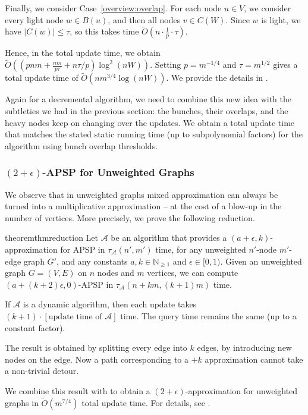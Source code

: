 \documentclass[11pt]{article}
\theoremstyle{definition}
\theoremstyle{remark}
\begin{document}
\begin{titlepage}
Finally, we consider Case~\ref{overview:overlap}. For each node $u\in V$, we consider every light node $w\in B(u)$, and then all nodes $v\in C(W)$. Since $w$ is light, we have $|C(w)|\leq \tau$, so this takes time $\tilde O(n\cdot \tfrac{1}{p}\cdot \tau)$.  

Hence, in the total update time, we obtain $\tilde O((pnm+\tfrac{nm}{p\tau}+n\tau/p)\log^2(nW))$. Setting $p=m^{-1/4}$ and $\tau = m^{1/2}$ gives a total update time of $\tilde O(nm^{3/4}\log(nW))$. We provide the details in .

Again for a decremental algorithm, we need to combine this new idea with the subtleties we had in the previous section: the bunches, their overlaps, and the heavy nodes keep on changing over the updates. We obtain a total update time that matches the stated static running time (up to subpolynomial factors) for the algorithm using bunch overlap thresholds. 

 





\subsubsection{\texorpdfstring{$(2+\epsilon)$}{(2+epsilon)}-APSP for Unweighted Graphs} 
We observe that in unweighted graphs mixed approximation can always be turned into a multiplicative approximation -- at the cost of a blow-up in the number of vertices. More precisely, we prove the following reduction. 
\begin{restatable}{theorem}{thmreduction}\label{thm:reduction}
   Let $\mathcal A$ be an algorithm that provides a $(a+\epsilon,k)$-approximation for APSP in $\tau_{\mathcal A}(n',m')$ time, for any unweighted $n'$-node $m'$-edge graph $G'$, and any constants  $a,k\in \mathbb N_{\geq 1}$ and $\epsilon\in[0,1)$. Given an unweighted graph $G=(V,E)$ on $n$ nodes and $m$ vertices, we can compute $(a+(k+2)\epsilon,0)$-APSP in $\tau_{\mathcal A}(n+km,(k+1)m)$ time. 

    If $\mathcal A$ is a dynamic algorithm, then each update takes $(k+1)\cdot [\text{update time of }\mathcal A]$ time. The query time remains the same (up to a constant factor). 
\end{restatable}
The result is obtained by splitting every edge into $k$ edges, by introducing new nodes on the edge. Now a path corresponding to a $+k$ approximation cannot take a non-trivial detour. 

We combine this result with  to obtain a $(2+\epsilon)$-approximation for unweighted graphs in $\tilde O(m^{7/4})$ total update time. For details, see .





\end{titlepage}
\end{document}
